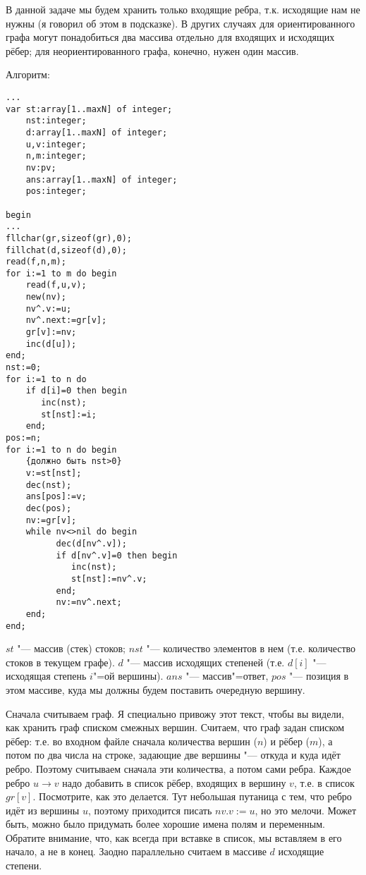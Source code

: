 В данной задаче мы будем хранить только входящие ребра, т.к. исходящие нам не нужны (я говорил об этом
в подсказке). В других случаях для ориентированного графа могут понадобиться два массива отдельно для
входящих и исходящих рёбер; для неориентированного графа, конечно, нужен один массив.

Алгоритм:
\begin{codesamplec}{3}\begin{verbatim}
...
var st:array[1..maxN] of integer;
    nst:integer;
    d:array[1..maxN] of integer;
    u,v:integer;
    n,m:integer;
    nv:pv;
    ans:array[1..maxN] of integer;
    pos:integer;
    
begin
...
fllchar(gr,sizeof(gr),0);
fillchat(d,sizeof(d),0);
read(f,n,m);
for i:=1 to m do begin
    read(f,u,v);
    new(nv);
    nv^.v:=u;
    nv^.next:=gr[v];
    gr[v]:=nv;
    inc(d[u]);
end;
nst:=0;
for i:=1 to n do
    if d[i]=0 then begin
       inc(nst);
       st[nst]:=i;
    end;
pos:=n;
for i:=1 to n do begin
    {должно быть nst>0}
    v:=st[nst];
    dec(nst);
    ans[pos]:=v;
    dec(pos);
    nv:=gr[v];
    while nv<>nil do begin
          dec(d[nv^.v]);
          if d[nv^.v]=0 then begin
             inc(nst);
             st[nst]:=nv^.v;
          end;
          nv:=nv^.next;
    end;
end;
\end{verbatim}
\end{codesamplec}
$st$ "--- массив (стек) стоков; $nst$ "--- количество элементов в нем (т.е. количество стоков в текущем графе).
$d$ "--- массив исходящих степеней (т.е. $d[i]$ "--- исходящая степень $i$"=ой вершины). $ans$ "--- массив"=ответ,
$pos$ "--- позиция в этом массиве, куда мы должны будем поставить очередную вершину.

Сначала считываем граф. Я специально привожу этот текст, чтобы вы видели, как хранить граф списком смежных вершин.
Считаем, что граф задан списком рёбер: т.е. во входном файле сначала количества вершин ($n$) и рёбер ($m$), а потом 
по два числа на строке, задающие две вершины "--- откуда и куда идёт ребро. Поэтому считываем сначала эти количества,
а потом сами ребра. Каждое ребро $u\to v$ надо добавить в список рёбер, входящих в вершину $v$, т.е. в список $gr[v]$.
Посмотрите, как это делается. Тут небольшая путаница с тем, что ребро идёт из вершины $u$, поэтому приходится
писать $nv.v:=u$, но это мелочи. Может быть, можно было придумать более хорошие имена полям и переменным. Обратите
внимание, что, как всегда при вставке в список, мы вставляем в его начало, а не в конец. Заодно параллельно
считаем в массиве $d$ исходящие степени.

